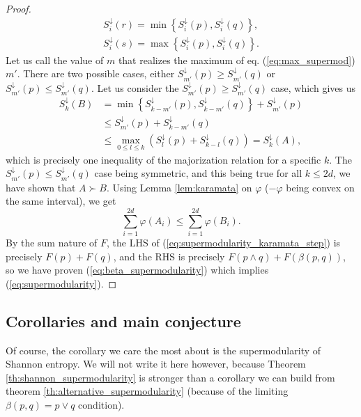 \begin{proof}
    \begin{gather}
        S^\downarrow_i (r) = \min \left\{S^\downarrow_i (p), S^\downarrow_i (q)\right\}, \\
        S^\downarrow_i (s) = \max \left\{S^\downarrow_i (p), S^\downarrow_i (q)\right\}.
    \end{gather} 
    Let us call the value of $m$ that realizes the maximum of eq. (\ref{eq:max_supermod}) $m'$. There are two possible cases, either $S^\downarrow_{m'} (p) \geq S^\downarrow_{m'} (q)$ or $S^\downarrow_{m'} (p) \leq S^\downarrow_{m'} (q)$. Let us consider the $S^\downarrow_{m'} (p) \geq S^\downarrow_{m'} (q)$ case, which gives us
    \begin{align}
        S^\downarrow_k (B) &= \min \left\{S^\downarrow_{k-m'} (p), S^\downarrow_{k-m'} (q)\right\} + S^\downarrow_{m'} (p) \\
        &\leq S^\downarrow_{m'} (p) + S^\downarrow_{k-m'} (q) \\
        &\leq \max_{0\leq l\leq k} \left(S^\downarrow_l (p) +S^\downarrow_{k-l} (q)\right) = S^\downarrow_k (A),
    \end{align}
    which is precisely one inequality of the majorization relation for a specific $k$. The $S^\downarrow_{m'} (p) \leq S^\downarrow_{m'} (q)$ case being symmetric, and this being true for all $k \leq 2d$, we have shown that $A \succ B$.
    Using Lemma \ref{lem:karamata} on $\varphi$ ($-\varphi$ being convex on the same interval), we get
    \begin{equation} \label{eq:supermodularity_karamata_step}
        \sum_{i=1}^{2d} \varphi(A_i) \leq \sum_{i=1}^{2d} \varphi(B_i).
    \end{equation}
    By the sum nature of $F$, the LHS of (\ref{eq:supermodularity_karamata_step}) is precisely $F(p) + F(q)$, and the RHS is precisely $F(p \wedge q) + F(\beta(p, q))$, so we have proven (\ref{eq:beta_supermodularity}) which implies (\ref{eq:supermodularity}). \qedhere
\end{proof}

\subsection{Corollaries and main conjecture}

Of course, the corollary we care the most about is the supermodularity of Shannon entropy. We will not write it here however, because Theorem \ref{th:shannon_supermodularity} is stronger than a corollary we can build from theorem \ref{th:alternative_supermodularity} (because of the limiting $\beta(p, q) = p \vee q$ condition).

